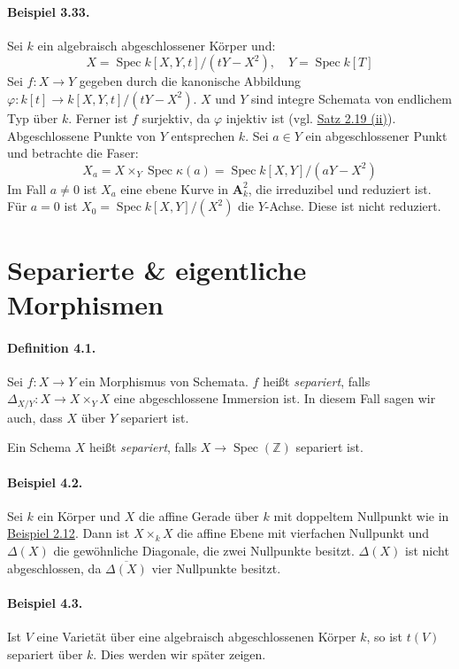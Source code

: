 \documentclass[11pt,b5paper,openany]{memoir}
\begin{document}
\paragraph{Beispiel 3.33.}\label{3.33} Sei $k$ ein algebraisch abgeschlossener Körper und:
\[X=\operatorname{Spec}k[X,Y,t]/(tY-X^2),\quad Y=\operatorname{Spec}k[T] \]
Sei $f:X\to Y$ gegeben durch die kanonische Abbildung $\varphi:k[t]\to k[X,Y,t]/(tY-X^2)$. $X$ und $Y$ sind integre Schemata von endlichem Typ über $k$. Ferner ist $f$ surjektiv, da $\varphi$ injektiv ist (vgl. \hyperref[2.19]{Satz 2.19 (ii)}). Abgeschlossene Punkte von $Y$ entsprechen $k$. Sei $a\in Y$ ein abgeschlossener Punkt und betrachte die Faser: \[X_a=X\times_Y\operatorname{Spec}\kappa(a)=\operatorname{Spec}k[X,Y]/(aY-X^2)\]
Im Fall $a\neq 0$ ist $X_a$ eine ebene Kurve in $\mathbf{A}_k^2$, die irreduzibel und reduziert ist. Für $a=0$ ist $X_0=\operatorname{Spec}k[X,Y]/(X^2)$ die $Y$-Achse. Diese ist nicht reduziert.

\section{Separierte \& eigentliche Morphismen}

\paragraph{Definition 4.1.}\label{4.1} Sei $f:X\to Y$ ein Morphismus von Schemata. $f$ heißt \textit{separiert}, falls $\Delta_{X/Y}:X\to X\times_YX$ eine abgeschlossene Immersion ist. In diesem Fall sagen wir auch, dass $X$ über $Y$ separiert ist. 

Ein Schema $X$ heißt \textit{separiert}, falls $X\to\operatorname{Spec}(\mathbb{Z})$ separiert ist.

\paragraph{Beispiel 4.2.}\label{4.2} Sei $k$ ein Körper und $X$ die affine Gerade über $k$ mit doppeltem Nullpunkt wie in \hyperref[2.12]{Beispiel 2.12}. Dann ist $X\times_kX$ die affine Ebene mit vierfachen Nullpunkt und $\Delta(X)$ die gewöhnliche Diagonale, die zwei Nullpunkte besitzt. $\Delta(X)$ ist nicht abgeschlossen, da $\overline{\Delta(X)}$ vier Nullpunkte besitzt.

\paragraph{Beispiel 4.3.}\label{4.3} Ist $V$ eine Varietät über eine algebraisch abgeschlossenen Körper $k$, so ist $t(V)$ separiert über $k$. Dies werden wir später zeigen.
\end{document}
